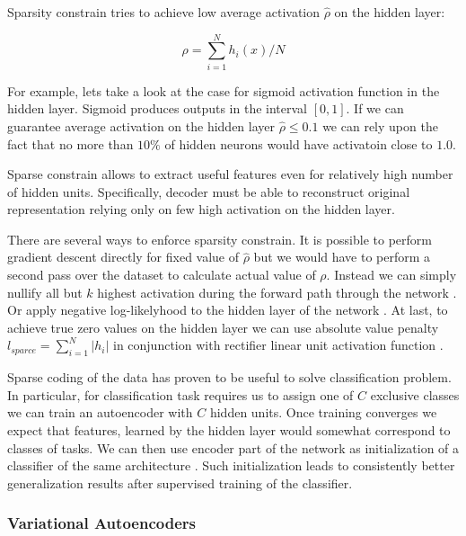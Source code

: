 Sparsity constrain tries to achieve low average activation $\hat{\rho}$ on the hidden layer:

\begin{equation}\label{eq:avgh}
  \rho = \sum_{i=1}^N h_i(x)/N
\end{equation}

For example, lets take a look at the case for sigmoid activation function in the hidden layer.
Sigmoid produces outputs in the interval $[0, 1]$. If we can guarantee average activation on the hidden layer $\hat{\rho} \leq 0.1$ we can rely upon the fact that no more than $10\%$ of hidden neurons would have activatoin close to $1.0$.

Sparse constrain allows to extract useful features even for relatively high number of hidden units. Specifically, decoder must be able to reconstruct original representation relying only on few high activation on the hidden layer.

There are several ways to enforce sparsity constrain.
It is possible to perform gradient descent directly for fixed value of $\hat{\rho}$ but we would have to perform a second pass over the dataset to calculate actual value of $\rho$. Instead we can simply nullify all but $k$ highest activation during the forward path through the network \cite{Kulkarni2015}.
Or apply negative log-likelyhood to the hidden layer of the network \cite{Zhao2015}.
At last, to achieve true zero values on the hidden layer we can use absolute value penalty $l_{sparce}=\sum_{i=1}^N |h_i|$ in conjunction with rectifier linear unit activation function \cite{Glorot2011}.

Sparse coding of the data has proven to be useful to solve classification problem.
In particular, for classification task requires us to assign one of $C$ exclusive classes we can train an autoencoder with $C$ hidden units. Once training converges we expect that features, learned by the hidden layer would somewhat correspond to classes of tasks. We can then use encoder part of the network as initialization of a classifier of the same architecture \cite{Masci2011}.
Such initialization leads to consistently better generalization results after supervised training of the classifier.

\subsubsection{Variational Autoencoders}\label{ch:vae}



